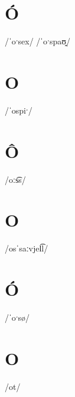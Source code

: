 \documentclass[10pt,a4paper,twoside]{book}
\begin{document}
\section*{Ó}

\begin{multicols}{3}
 {/ˈoˑsex/} {}
 {/ˈoˑspaʊ̯/} {}
\end{multicols}

\section*{O}

\begin{multicols}{3}
 {/ˈospiˑ/} {}
\end{multicols}

\section*{Ô}

\begin{multicols}{3}
 {/oːs͡s/} {}
\end{multicols}

\section*{O}

\begin{multicols}{3}
 {/osˈsaːvjel͡l/} {}
\end{multicols}

\section*{Ó}

\begin{multicols}{3}
 {/ˈoˑsø/} {}
\end{multicols}

\section*{O}

\begin{multicols}{3}
 {/ot/} {}
\end{multicols}
\end{document}
